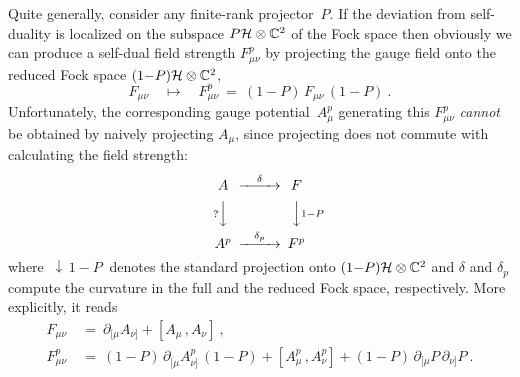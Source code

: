 \documentclass[a4paper,11pt]{article}
\numberwithin{equation}{section}
\newcommand{\C}{\mathbb C}
\newcommand{\Hcal}{{\cal H}}
\def\pa{\mbox{$\partial$}}
\begin{document}
{Quite generally, consider any finite-rank projector~$P$.
If the deviation from self-duality is localized on the subspace 
$P\Hcal\otimes\C^2$ of the Fock space then obviously 
we can produce a self-dual field strength $F^p_{\mu\nu}$
by projecting the gauge field onto the reduced
Fock space $(1{-}P)\Hcal\otimes\C^2$,  
\begin{equation}\label{FP1}
F_{\mu\nu}\quad\mapsto\quad F^p_{\mu\nu}\ =\ (1{-}P)\,F_{\mu\nu}\,(1{-}P)\ .
\end{equation}
Unfortunately, the corresponding gauge potential~$A^p_\mu$ generating this 
$F^p_{\mu\nu}$ {\it cannot\/} be obtained by naively projecting $A_{\mu}$, 
since projecting does not commute with calculating the field strength:
$$
\begin{CD}
A @>{\delta}>> F \\
@V{?}VV @VV{1{-}P}V \\
A^p @>{\delta_p}>> F^p
\end{CD}
$$
where $\ {\downarrow}\,{\scriptstyle1{-}P}\ $ denotes the standard projection
onto $(1{-}P)\Hcal\otimes\C^2$ and $\delta$ and $\delta_p$ compute 
the curvature in the full and the reduced Fock space, respectively. 
More explicitly, it reads
\begin{align}
F_{\mu\nu}\ &=\ \pa_{[\mu} A_{\nu]} + [A_\mu\,,A_\nu] \ , \nonumber\\[8pt]
F^p_{\mu\nu}\ &=\ (1{-}P)\,\pa^{\phantom{p}}_{[\mu} A^p_{\nu]}\,(1{-}P) +
[A^p_\mu\,,A^p_\nu] + (1{-}P)\,\pa_{[\mu}P\,\pa_{\nu]}P \ . \label{FP2}
\end{align}

}
\end{document}
